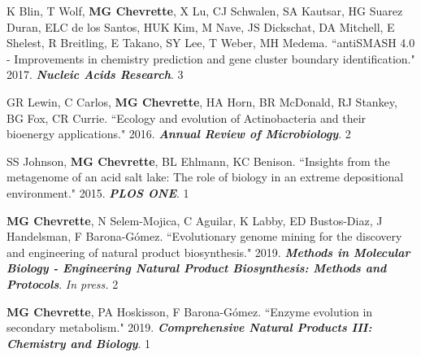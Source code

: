 \begin{cvpubs}
\cvpub
{K Blin, T Wolf, \textbf{MG Chevrette}, X Lu, CJ Schwalen, SA Kautsar, HG Suarez Duran, ELC de los Santos, HUK Kim, M Nave, JS Dickschat, DA Mitchell, E Shelest, R Breitling, E Takano, SY Lee, T Weber, MH Medema. ``antiSMASH 4.0 - Improvements in chemistry prediction and gene cluster boundary identification." 2017. \textit{\textbf{Nucleic Acids Research}}. \textbf{\textit{}}}
{3}

\cvpub
{GR Lewin, C Carlos, \textbf{MG Chevrette}, HA Horn, BR McDonald, RJ Stankey, BG Fox, CR Currie. ``Ecology and evolution of Actinobacteria and their bioenergy applications." 2016. \textit{\textbf{Annual Review of Microbiology}}. \textbf{\textit{}}}
{2}

\cvpub
{SS Johnson, \textbf{MG Chevrette}, BL Ehlmann, KC Benison. ``Insights from the metagenome of an acid salt lake: The role of biology in an extreme depositional environment."  2015. \textit{\textbf{PLOS ONE}}. \textbf{\textit{}}}
{1}

\end{cvpubs}


\begin{cvpubs}

\cvpub
{\textbf{MG Chevrette}, N Selem-Mojica, C Aguilar, K Labby, ED Bustos-Diaz, J Handelsman, F Barona-G\'{o}mez. ``Evolutionary genome mining for the discovery and engineering of natural product biosynthesis." 2019. \textit{\textbf{Methods in Molecular Biology - Engineering Natural Product Biosynthesis: Methods and Protocols}}. \textit{In press.}}
{2}

\cvpub
{\textbf{MG Chevrette}, PA Hoskisson, F Barona-G\'{o}mez. ``Enzyme evolution in secondary metabolism." 2019. \textit{\textbf{Comprehensive Natural Products III: Chemistry and Biology}}. \textbf{\textit{}}}
{1}

\end{cvpubs}


